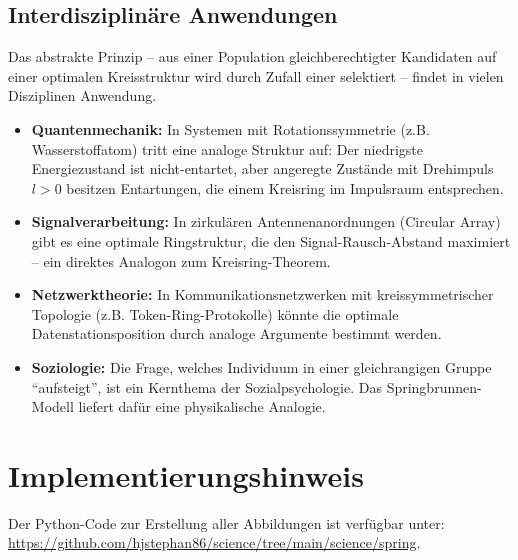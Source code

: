 ﻿\documentclass[a4paper,12pt]{article}
\theoremstyle{definition}
\begin{document}
\subsection{Interdisziplinäre Anwendungen}

Das abstrakte Prinzip -- aus einer Population gleichberechtigter Kandidaten auf einer
optimalen Kreisstruktur wird durch Zufall einer selektiert -- findet in vielen Disziplinen
Anwendung.

\begin{itemize}
    \item \textbf{Quantenmechanik:} In Systemen mit Rotationssymmetrie (z.B. Wasserstoffatom)
          tritt eine analoge Struktur auf: Der niedrigste Energiezustand ist nicht-entartet,
          aber angeregte Zustände mit Drehimpuls $l > 0$ besitzen Entartungen, die einem
          Kreisring im Impulsraum entsprechen.
    \item \textbf{Signalverarbeitung:} In zirkulären Antennenanordnungen (Circular Array)
          gibt es eine optimale Ringstruktur, die den Signal-Rausch-Abstand maximiert --
          ein direktes Analogon zum Kreisring-Theorem.
    \item \textbf{Netzwerktheorie:} In Kommunikationsnetzwerken mit kreissymmetrischer
          Topologie (z.B. Token-Ring-Protokolle) könnte die optimale Datenstationsposition
          durch analoge Argumente bestimmt werden.
    \item \textbf{Soziologie:} Die Frage, welches Individuum in einer gleichrangigen
          Gruppe ``aufsteigt'', ist ein Kernthema der Sozialpsychologie. Das Springbrunnen-
          Modell liefert dafür eine physikalische Analogie.
\end{itemize}

\section*{Implementierungshinweis}

Der Python-Code zur Erstellung aller Abbildungen ist verfügbar unter:
\url{https://github.com/hjstephan86/science/tree/main/science/spring}.
\end{document}
